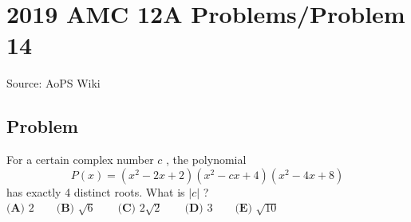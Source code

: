 \documentclass[12pt]{article}
\begin{document}
\section*{{2019 AMC 12A Problems/Problem 14}}
Source: AoPS Wiki

\subsection*{Problem}
For a certain complex number $c$ , the polynomial \[P(x) = (x^2 - 2x + 2)(x^2 - cx + 4)(x^2 - 4x + 8)\] has exactly 4 distinct roots. What is $|c|$ ? $\textbf{(A) } 2 \qquad \textbf{(B) } \sqrt{6} \qquad \textbf{(C) } 2\sqrt{2} \qquad \textbf{(D) } 3 \qquad \textbf{(E) } \sqrt{10}$
\end{document}
